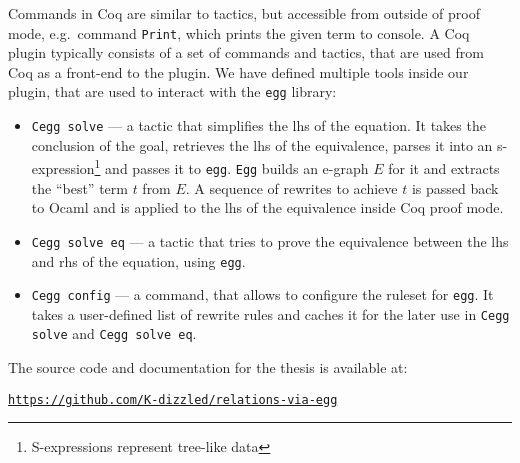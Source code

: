 Commands in Coq are similar to tactics, but accessible from outside of proof mode, e.g.\ command \texttt{Print}, which prints the given term to console. A Coq plugin typically consists of a set of commands and tactics, that are used from Coq as a front-end to the plugin. 
We have defined multiple tools inside our plugin, that are used to interact with the \texttt{egg} library: 
\begin{itemize}
    \item \texttt{Cegg solve} --- a tactic that simplifies the lhs of the equation. It takes the conclusion of the goal, retrieves the lhs of the equivalence, parses it into an s-expression\footnote{S-expressions represent tree-like data} and passes it to \texttt{egg}. \texttt{Egg} builds an e-graph $E$ for it and extracts the ``best'' term $t$ from $E$. A sequence of rewrites to achieve $t$ is passed back to Ocaml and is applied to the lhs of the equivalence inside Coq proof mode. 
    \item \texttt{Cegg solve eq} --- a tactic that tries to prove the equivalence between the lhs and rhs of the equation, using \texttt{egg}. 
    \item \texttt{Cegg config} --- a command, that allows to configure the ruleset for \texttt{egg}. It takes a user-defined list of rewrite rules and caches it for the later use in \texttt{Cegg solve} and \texttt{Cegg solve eq}.
\end{itemize}
The source code and documentation for the thesis is available at:
\begin{center}
    \href{https://github.com/K-dizzled/relations-via-egg}{\texttt{https://github.com/K-dizzled/relations-via-egg}}
\end{center}

